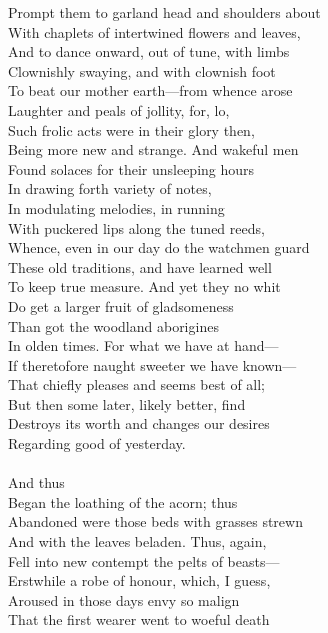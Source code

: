 Prompt them to garland head and shoulders about\\
With chaplets of intertwined flowers and leaves,\\
And to dance onward, out of tune, with limbs\\
Clownishly swaying, and with clownish foot\\
To beat our mother earth—from whence arose\\
Laughter and peals of jollity, for, lo,\\
Such frolic acts were in their glory then,\\
Being more new and strange. And wakeful men\\
Found solaces for their unsleeping hours\\
In drawing forth variety of notes,\\
In modulating melodies, in running\\
With puckered lips along the tuned reeds,\\
Whence, even in our day do the watchmen guard\\
These old traditions, and have learned well\\
To keep true measure. And yet they no whit\\
Do get a larger fruit of gladsomeness\\
Than got the woodland aborigines\\
In olden times. For what we have at hand—\\
If theretofore naught sweeter we have known—\\
That chiefly pleases and seems best of all;\\
But then some later, likely better, find\\
Destroys its worth and changes our desires\\
Regarding good of yesterday.\\
\\
And thus\\
Began the loathing of the acorn; thus\\
Abandoned were those beds with grasses strewn\\
And with the leaves beladen. Thus, again,\\
Fell into new contempt the pelts of beasts—\\
Erstwhile a robe of honour, which, I guess,\\
Aroused in those days envy so malign\\
That the first wearer went to woeful death\\
